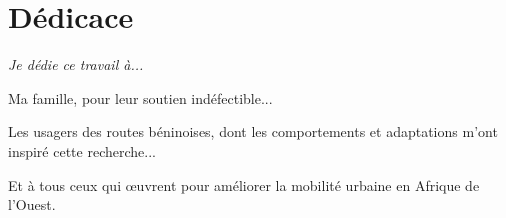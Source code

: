 \chapter*{Dédicace}
\thispagestyle{empty}

\vspace*{2cm}

\begin{flushright}
\emph{Je dédie ce travail à...}

\vspace{1cm}

Ma famille, pour leur soutien indéfectible...

\vspace{1cm}

Les usagers des routes béninoises, dont les comportements 
et adaptations m'ont inspiré cette recherche...

\vspace{1cm}

Et à tous ceux qui œuvrent pour améliorer 
la mobilité urbaine en Afrique de l'Ouest.
\end{flushright}

\vspace*{\fill}
